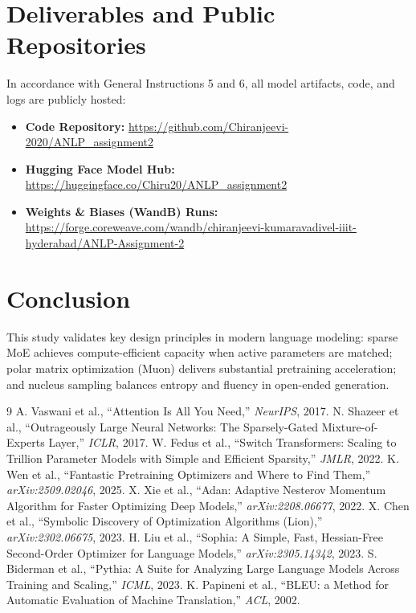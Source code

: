 \documentclass[11pt,a4paper]{article}
\begin{document}
\section{Deliverables and Public Repositories}

In accordance with General Instructions 5 and 6, all model artifacts, code, and logs are publicly hosted:
\begin{itemize}
    \item \textbf{Code Repository:} \url{https://github.com/Chiranjeevi-2020/ANLP_assignment2}
    \item \textbf{Hugging Face Model Hub:} \url{https://huggingface.co/Chiru20/ANLP_assignment2}
    \item \textbf{Weights \& Biases (WandB) Runs:} \url{https://forge.coreweave.com/wandb/chiranjeevi-kumaravadivel-iiit-hyderabad/ANLP-Assignment-2}
\end{itemize}

\section{Conclusion}
This study validates key design principles in modern language modeling: sparse MoE achieves compute-efficient capacity when active parameters are matched; polar matrix optimization (Muon) delivers substantial pretraining acceleration; and nucleus sampling balances entropy and fluency in open-ended generation.

\begin{thebibliography}{9}
 A. Vaswani et al., ``Attention Is All You Need,'' \textit{NeurIPS}, 2017.
 N. Shazeer et al., ``Outrageously Large Neural Networks: The Sparsely-Gated Mixture-of-Experts Layer,'' \textit{ICLR}, 2017.
 W. Fedus et al., ``Switch Transformers: Scaling to Trillion Parameter Models with Simple and Efficient Sparsity,'' \textit{JMLR}, 2022.
 K. Wen et al., ``Fantastic Pretraining Optimizers and Where to Find Them,'' \textit{arXiv:2509.02046}, 2025.
 X. Xie et al., ``Adan: Adaptive Nesterov Momentum Algorithm for Faster Optimizing Deep Models,'' \textit{arXiv:2208.06677}, 2022.
 X. Chen et al., ``Symbolic Discovery of Optimization Algorithms (Lion),'' \textit{arXiv:2302.06675}, 2023.
 H. Liu et al., ``Sophia: A Simple, Fast, Hessian-Free Second-Order Optimizer for Language Models,'' \textit{arXiv:2305.14342}, 2023.
 S. Biderman et al., ``Pythia: A Suite for Analyzing Large Language Models Across Training and Scaling,'' \textit{ICML}, 2023.
 K. Papineni et al., ``BLEU: a Method for Automatic Evaluation of Machine Translation,'' \textit{ACL}, 2002.
\end{thebibliography}
\end{document}
